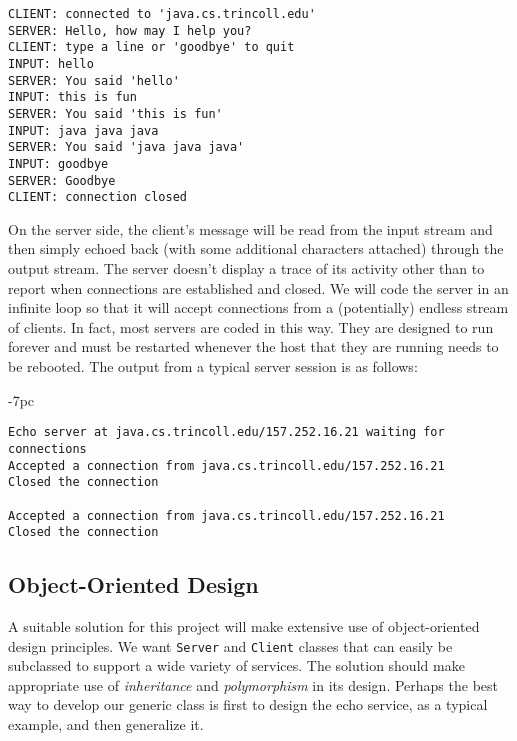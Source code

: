 \begin{jjjlisting}
\begin{lstlisting}
CLIENT: connected to 'java.cs.trincoll.edu'
SERVER: Hello, how may I help you?
CLIENT: type a line or 'goodbye' to quit
INPUT: hello
SERVER: You said 'hello'
INPUT: this is fun
SERVER: You said 'this is fun'
INPUT: java java java
SERVER: You said 'java java java'
INPUT: goodbye
SERVER: Goodbye
CLIENT: connection closed
\end{lstlisting}
\end{jjjlisting}

\noindent On the server side, the client's
message will be read from the input stream and then simply echoed back
(with  some additional characters attached) through the output
stream.  The server doesn't display a trace of its activity other than
to report when connections are established and closed.  We will code
the server in an infinite loop so that it will accept connections
from a (potentially) endless stream of clients.  In fact, most servers
are coded in this way.  They are designed to run forever and must be
restarted whenever the host that they are running needs to be rebooted.
The output from a typical server session is as follows:

\begin{jjjlistingleft}[33pc]{-7pc}
\begin{lstlisting}
Echo server at java.cs.trincoll.edu/157.252.16.21 waiting for connections
Accepted a connection from java.cs.trincoll.edu/157.252.16.21
Closed the connection

Accepted a connection from java.cs.trincoll.edu/157.252.16.21
Closed the connection
\end{lstlisting}
\end{jjjlistingleft}


\subsection{Object-Oriented Design}
\noindent A suitable solution for this project will make extensive use of
object-oriented design principles.  We want {\tt Server} and
{\tt Client} classes that can easily be subclassed to support a wide
variety of services.  The solution should make appropriate use of {\it
inheritance} and {\it polymorphism} in its design.  Perhaps the best
way to develop our generic class is first to design the echo service,
as a typical example, and then generalize it.

